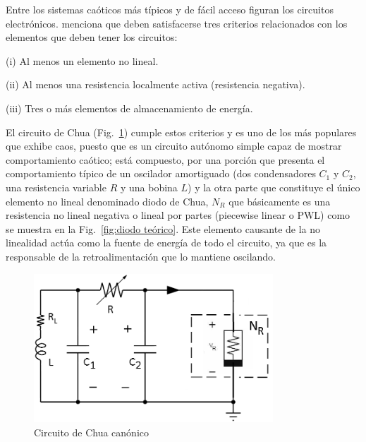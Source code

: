 \documentclass{article}
\begin{document}
    Entre los sistemas caóticos más típicos y de fácil acceso figuran los circuitos electrónicos. \cite{kennedy1993three} menciona que deben satisfacerse tres criterios relacionados con los elementos que deben tener los circuitos: 
    
    (i) Al menos un elemento no lineal.
    
    (ii) Al menos una resistencia localmente activa (resistencia negativa). 
    
    (iii) Tres o más elementos de almacenamiento de energía.

    El circuito de Chua (Fig.~\ref{fig:circuito de Chua}) cumple estos criterios y es uno de los más populares que exhibe caos, puesto que es un circuito autónomo simple capaz de mostrar comportamiento caótico; está compuesto, por una porción que presenta el comportamiento típico de un oscilador amortiguado (dos condensadores $C_1$ y $C_2$, una resistencia variable $R$ y una bobina $L$) y la otra parte que constituye el único elemento no lineal denominado diodo de Chua, $N_R$ que básicamente es una resistencia no lineal negativa o lineal por partes (piecewise linear o PWL) como se muestra en la Fig.~\ref{fig:diodo teórico}. Este elemento causante de la no linealidad actúa como la fuente de energía de todo el circuito, ya que es la responsable de la retroalimentación que lo mantiene oscilando.
    
    \begin{figure}[h!]
        \centering
        \includegraphics[width=0.8\textwidth]{Chua/circuitodechua.png}
        \caption{Circuito de Chua canónico}
        \label{fig:circuito de Chua}
    \end{figure}
    
\end{document}

